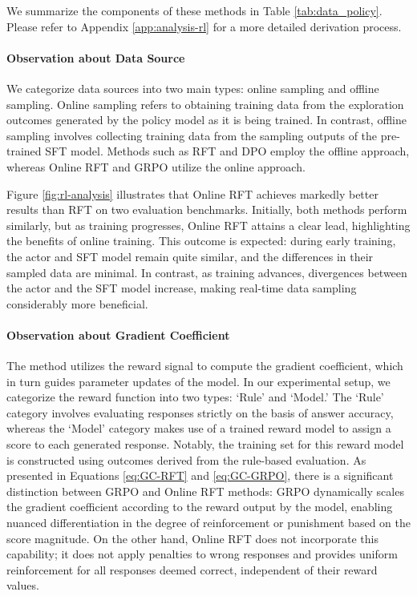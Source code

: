 \begin{itemize}[topsep=0pt]
We summarize the components of these methods in Table \ref{tab:data_policy}.
Please refer to Appendix \ref{app:analysis-rl} for a more detailed derivation process.

\paragraph{Observation about Data Source} We categorize data sources into two main types: online sampling and offline sampling. Online sampling refers to obtaining training data from the exploration outcomes generated by the policy model as it is being trained. In contrast, offline sampling involves collecting training data from the sampling outputs of the pre-trained SFT model. Methods such as RFT and DPO employ the offline approach, whereas Online RFT and GRPO utilize the online approach.

Figure \ref{fig:rl-analysis} illustrates that Online RFT achieves markedly better results than RFT on two evaluation benchmarks. Initially, both methods perform similarly, but as training progresses, Online RFT attains a clear lead, highlighting the benefits of online training. This outcome is expected: during early training, the actor and SFT model remain quite similar, and the differences in their sampled data are minimal. In contrast, as training advances, divergences between the actor and the SFT model increase, making real-time data sampling considerably more beneficial.

\paragraph{Observation about Gradient Coefficient} The method utilizes the reward signal to compute the gradient coefficient, which in turn guides parameter updates of the model. In our experimental setup, we categorize the reward function into two types: ‘Rule’ and ‘Model.’ The ‘Rule’ category involves evaluating responses strictly on the basis of answer accuracy, whereas the ‘Model’ category makes use of a trained reward model to assign a score to each generated response. Notably, the training set for this reward model is constructed using outcomes derived from the rule-based evaluation. As presented in Equations \ref{eq:GC-RFT} and \ref{eq:GC-GRPO}, there is a significant distinction between GRPO and Online RFT methods: GRPO dynamically scales the gradient coefficient according to the reward output by the model, enabling nuanced differentiation in the degree of reinforcement or punishment based on the score magnitude. On the other hand, Online RFT does not incorporate this capability; it does not apply penalties to wrong responses and provides uniform reinforcement for all responses deemed correct, independent of their reward values.


\end{itemize}
